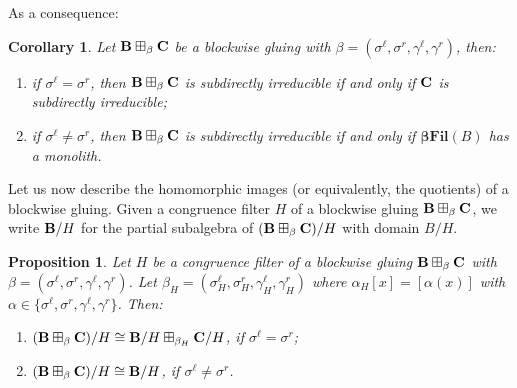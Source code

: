 \documentclass{amsart}
\newtheorem{proposition}[theorem]{Proposition}
\newtheorem{corollary}[theorem]{Corollary}
\theoremstyle{definition}
\numberwithin{equation}{section}
\newcommand{\alg}[1]{{\textbf{\upshape #1}}}  %
\newcommand{\sell}{\sigma^\ell}
\newcommand{\sr}{\sigma^r}
\newcommand{\gell}{\gamma^\ell}
\newcommand{\gr}{\gamma^r}
\newcommand{\betafil}{\mathbf{\beta Fil}}
\begin{document}
As a consequence:
\begin{corollary}
	Let $\alg B \boxplus_\beta \alg C$ be a blockwise gluing with $\beta=( \sell, \sr, \gell, \gr)$, then: 
	\begin{enumerate}
		\item if $\sell=\sr$, then $\alg B \boxplus_\beta \alg C$ is subdirectly irreducible if and only if $\alg C$ is subdirectly irreducible; 
		\item if $\sell \neq \sr$, then $\alg B \boxplus_\beta \alg C$ is subdirectly irreducible if and only if $\betafil( B)$ has a monolith.
	\end{enumerate}
\end{corollary}
Let us now describe the homomorphic images (or equivalently, the quotients) of a blockwise gluing. Given a congruence filter $H$ of a blockwise gluing $\alg B \boxplus_\beta \alg C$, we write $\alg B / H$ for the partial subalgebra of $(\alg B \boxplus_\beta \alg C)/H$ with domain $B/H$. 
\begin{proposition}
	Let $H$ be a congruence filter of a blockwise gluing $\alg B \boxplus_\beta \alg C$ with $\beta = (\sell, \sr, \gell, \gr)$. Let $\beta_H=(\sell_H, \sr_H, \gell_H, \gr_H)$ where $\alpha_H[x]=[\alpha(x)]$ with $\alpha \in \{ \sell, \sr, \gell, \gr\}$.
	Then:
	\begin{enumerate}
		\item  $(\alg B \boxplus_\beta \alg C)/H\cong \alg B / H \boxplus_{\beta_H} \alg C /H$, if $\sell=\sr$;
		\item $(\alg B \boxplus_\beta \alg C)/H\cong \alg B/ H$, if $\sell \neq \sr$.
	\end{enumerate}
\end{proposition}
\end{document}
